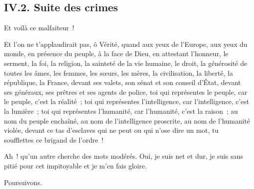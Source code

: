 \documentclass[french,twoside]{book} %
\begin{document}
\subsection[{IV.2. Suite des crimes}]{IV.2. Suite des crimes}
\noindent Et voilà ce malfaiteur !\par
Et l’on ne t’applaudirait pas, ô Vérité, quand aux yeux de l’Europe, aux yeux du monde, en présence du peuple, à la face de Dieu, en attestant l’honneur, le serment, la foi, la religion, la sainteté de la vie humaine, le droit, la générosité de toutes les âmes, les femmes, les sœurs, les mères, la civilisation, la liberté, la république, la France, devant ses valets, son sénat et son conseil d’État, devant ses généraux, ses prêtres et ses agents de police, toi qui représentes le peuple, car le peuple, c’est la réalité ; toi qui représentes l’intelligence, car l’intelligence, c’est la lumière ; toi qui représentes l’humanité, car l’humanité, c’est la raison ; au nom du peuple enchaîné, au nom de l’intelligence proscrite, au nom de l’humanité violée, devant ce tas d’esclaves qui ne peut ou qui n’ose dire un mot, tu soufflettes ce brigand de l’ordre !\par
Ah ! qu’un autre cherche des mots modérés. Oui, je suis net et dur, je suis sans pitié pour cet impitoyable et je m’en fais gloire.\par
Poursuivons.\par
\end{document}

